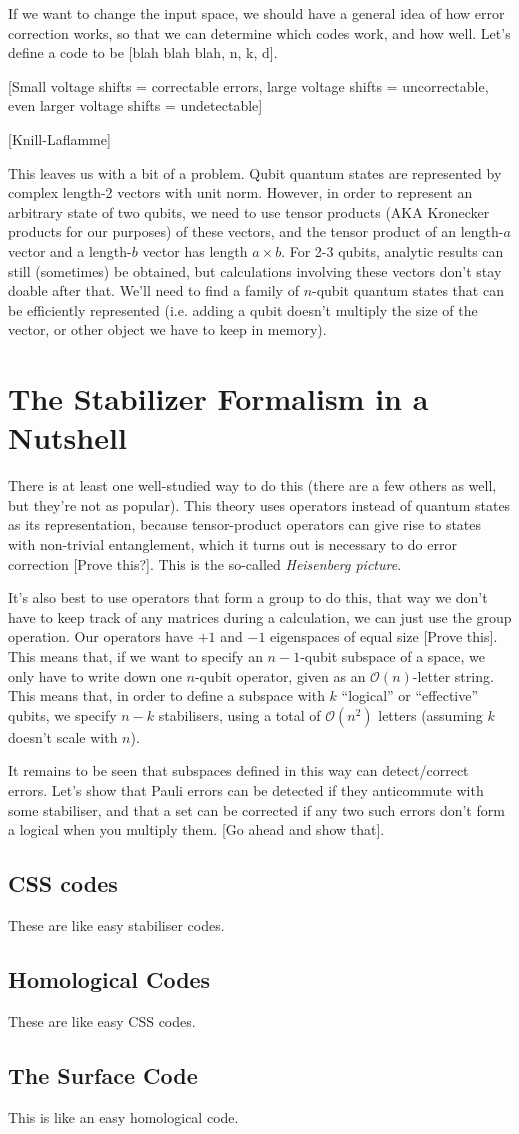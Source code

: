 \documentclass[10pt,a4paper, english]{scrartcl}
\begin{document}
If we want to change the input space, we should have a general idea of how error correction works, so that we can determine which codes work, and how well. 
Let's define a code to be [blah blah blah, n, k, d]. 

[Small voltage shifts = correctable errors, large voltage shifts = uncorrectable, even larger voltage shifts = undetectable]

[Knill-Laflamme]

This leaves us with a bit of a problem. 
Qubit quantum states are represented by complex length-2 vectors with unit norm. 
However, in order to represent an arbitrary state of two qubits, we need to use tensor products (AKA Kronecker products for our purposes) of these vectors, and the tensor product of an length-$a$ vector and a length-$b$ vector has length $a \times b$. For 2-3 qubits, analytic results can still (sometimes) be obtained, but calculations involving these vectors don't stay doable after that. 
We'll need to find a family of $n$-qubit quantum states that can be efficiently represented (i.e. adding a qubit doesn't multiply the size of the vector, or other object we have to keep in memory).
\section{The Stabilizer Formalism in a Nutshell}
There is at least one well-studied way to do this (there are a few others as well, but they're not as popular).
This theory uses operators instead of quantum states as its representation, because tensor-product operators can give rise to states with non-trivial entanglement, which it turns out is necessary to do error correction [Prove this?].
This is the so-called \emph{Heisenberg picture}. 

It's also best to use operators that form a group to do this, that way we don't have to keep track of any matrices during a calculation, we can just use the group operation. 
Our operators have $+1$ and $-1$ eigenspaces of equal size [Prove this]. 
This means that, if we want to specify an $n-1$-qubit subspace of a space, we only have to write down one $n$-qubit operator, given as an $\mathcal{O}(n)$-letter string. 
This means that, in order to define a subspace with $k$ ``logical'' or ``effective'' qubits, 
we specify $n-k$ stabilisers, using a total of $\mathcal{O}(n^2)$ letters (assuming $k$ doesn't scale with $n$).

It remains to be seen that subspaces defined in this way can detect/correct errors.
Let's show that Pauli errors can be detected if they anticommute with some stabiliser, and that a set can be corrected if any two such errors don't form a logical when you multiply them.
[Go ahead and show that].
\subsection{CSS codes}
These are like easy stabiliser codes.
\subsection{Homological Codes}
These are like easy CSS codes.
\subsection{The Surface Code}
This is like an easy homological code.
\end{document}

